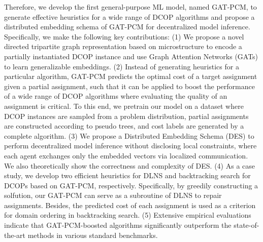 \documentclass[letterpaper]{article} %
\begin{document}
Therefore, we develop the first general-purpose ML model, named GAT-PCM, to generate effective heuristics for a wide range of DCOP algorithms and propose a distributed embedding schema of GAT-PCM for decentralized model inference. Specifically, we make the following key contributions: (1) We propose a novel directed tripartite graph representation based on microstructure \cite{jegou1993decomposition} to encode a partially instantiated DCOP instance and use Graph Attention Networks (GATs) \cite{vaswani2017attention} to learn generalizable embeddings. (2) Instead of generating heuristics for a particular algorithm, GAT-PCM predicts the optimal cost of a target assignment given a partial assignment, such that it can be applied to boost the performance of a wide range of DCOP algorithms where evaluating the quality of an assignment is critical.
To this end, we pretrain our model on a dataset where DCOP instances are sampled from a problem distribution, partial assignments are constructed according to pseudo trees, and cost labels are generated by a complete algorithm. 
(3) We propose a Distributed Embedding Schema (DES) to perform decentralized model inference without disclosing local constraints, where each agent exchanges only the embedded vectors via localized communication. We also theoretically show the correctness and complexity of DES.
(4) As a case study, we develop two efficient heuristics for DLNS \cite{hoang2018large} and backtracking search for DCOPs based on GAT-PCM, respectively. Specifically, by greedily constructing a solfution, our GAT-PCM can serve as a subroutine of DLNS to repair assignments. Besides, the predicted cost of each assignment is used as a criterion for domain ordering in backtracking search. (5) Extensive empirical evaluations indicate that GAT-PCM-boosted algorithms significantly outperform the state-of-the-art methods in various standard benchmarks.
\end{document}
